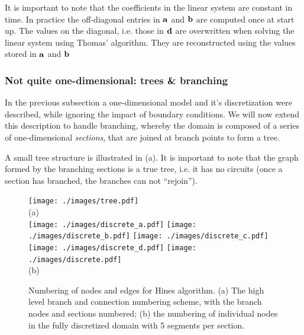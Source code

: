 It is important to note that the coefficients in the linear system are constant in time. In practice the off-diagonal entries in $\mathbf{a}$ and $\mathbf{b}$ are computed once at start up. The values on the diagonal, i.e. those in $\mathbf{d}$ are overwritten when solving the linear system using Thomas' algorithm. They are reconstructed using the values stored in $\mathbf{a}$ and $\mathbf{b}$
\subsubsection{Not quite one-dimensional: trees \& branching}
In the previous subsection a one-dimensional model and it's discretization were described, while ignoring the impact of boundary conditions. We will now extend this description to handle branching, whereby the domain is composed of a series of one-dimensional \emph{sections}, that are joined at branch points to form a tree.

A small tree structure is illustrated in (a). It is important to note that the graph formed by the branching sections is a true tree, i.e. it has no circuits (once a section has branched, the branches can not ``rejoin'').

\begin{figure}[htp!]
\centering
\texttt{[image: ./images/tree.pdf]}
\\{\normalsize (a)}\\
\texttt{[image: ./images/discrete\_a.pdf]}
\texttt{[image: ./images/discrete\_b.pdf]}
\texttt{[image: ./images/discrete\_c.pdf]}
\texttt{[image: ./images/discrete\_d.pdf]}
\texttt{[image: ./images/discrete.pdf]}
\\{\normalsize (b)}
\caption{Numbering of nodes and edges for Hines algorithm. (a) The high level branch and connection numbering scheme, with the branch nodes and sections numbered; (b) the numbering of individual nodes in the fully discretized domain with 5 segments per section.}
\label{fig:tree}
\end{figure}

